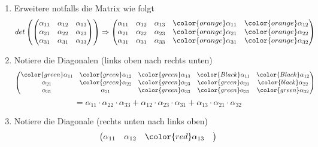 \begin{enumerate}
    \item Erweitere notfalls die Matrix wie folgt \newline
    \newline
    \[det\left ( \begin{pmatrix} \alpha_{11} & \alpha_{12} &\alpha_{13} \\ \alpha_{21}& \alpha_{22} &\alpha_{23} \\ \alpha_{31}& \alpha_{31} & \alpha_{33}\end{pmatrix} \right ) \Rightarrow \begin{pmatrix} \alpha_{11} & \alpha_{12} &\alpha_{13} &
        {\color{orange} \alpha_{11}} & {\color{orange} \alpha_{12}} \\ \alpha_{21}& \alpha_{22} &\alpha_{23} & {\color{orange} \alpha_{21}} & {\color{orange} \alpha_{22}}\\ \alpha_{31}& \alpha_{31} & \alpha_{33} & {\color{orange} \alpha_{31}} &
        {\color{orange} \alpha_{32}} \end{pmatrix}\] \newline
    \newline
    \item Notiere die Diagonalen (links oben nach rechts unten) \newline
    \newline
    \[ \begin{pmatrix}{\color{green} \alpha_{11}} & {\color{green} \alpha_{12}} &{\color{green} \alpha_{13}} & {\color{Black} \alpha_{11}} & {\color{Black} \alpha_{12}} \\
    \alpha_{21}& {\color{green} \alpha_{22}} &{\color{green} \alpha_{23}} & {\color{green} \alpha_{21}} & {\color{black} \alpha_{22}}\\ \alpha_{31}& \alpha_{31} & {\color{green} \alpha_{33}} &
        {\color{green} \alpha_{31}} & {\color{green} \alpha_{32}} \end{pmatrix} \] \newline
    \newline \[= \alpha_{11} \cdot \alpha_{22} \cdot \alpha_{33} + \alpha_{12} \cdot \alpha_{23} \cdot \alpha_{31} + \alpha_{13} \cdot \alpha_{21} \cdot \alpha_{32}\]
    \newpage
    \item Notiere die Diagonale (rechts unten nach links oben) \newline
    \newline
    \[\begin{pmatrix} \alpha_{11} & \alpha_{12} & {\color{red}\alpha_{13}} &

\end{pmatrix}\]
\end{enumerate}
